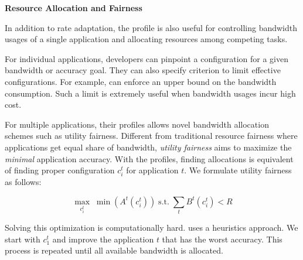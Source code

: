 %     

\vspace{1em}
\noindent\textbf{Resource Allocation and Fairness}

In addition to rate adaptation, the profile is also useful for controlling
bandwidth usages of a single application and allocating resources among
competing tasks.

For individual applications, developers can pinpoint a configuration for a given
bandwidth or accuracy goal. They can also specify criterion to limit effective
configurations. For example, \sysname{} can enforce an upper bound on the
bandwidth consumption. Such a limit is extremely useful when bandwidth usages
incur high cost.

For multiple applications, their profiles allows novel bandwidth allocation
schemes such as utility fairness. Different from traditional resource fairness
where applications get equal share of bandwidth, \textit{utility fairness} aims
to maximize the \textit{minimal} application accuracy. With the profiles,
finding allocations is equivalent of finding proper configuration $c_i^t$ for
application $t$. We formulate utility fairness as follows:

\begin{equation}
  \label{eq:multitask}
    \underset{c_i^t}{\max} \; \min({A^t(c_i^t)})
    \;
    \text{s.t.}
    \;
    \sum_t{B^t(c_i^t)} < R
\end{equation}

Solving this optimization is computationally hard. \sysname{} uses a heuristics
approach. We start with $c_1^t$ and improve the application $t$ that has the
worst accuracy. This process is repeated until all available bandwidth is
allocated.

